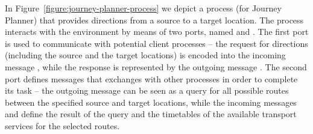 \documentclass{LMCS}
\begin{document}
\begin{exa}
  \label{example:journey-planner-process}
  In Figure~\ref{figure:journey-planner-process} we depict a process  (for Journey Planner) that provides directions from a source to a target location. The process interacts with the environment by means of two ports, named  and .
  The first port is used to communicate with potential client processes -- the request for directions (including the source and the target locations) is encoded into the incoming message , while the response is represented by the outgoing message .
  The second port defines messages that  exchanges with other processes in order to complete its task -- the outgoing message  can be seen as a query for all possible routes between the specified source and target locations, while the incoming messages  and  define the result of the query and the timetables of the available transport services for the selected routes.

  \begin{figure}[h]
    \centering
    

\end{figure}
\end{exa}
\end{document}
